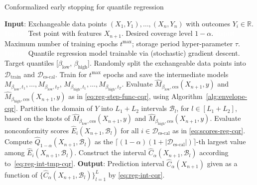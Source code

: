 \begin{algorithm}[H]
    \caption{Conformalized early stopping for quantile regression}
    \label{alg:reg-cqr}
    \begin{algorithmic}[1]
        \STATE \textbf{Input}: Exchangeable data points $(X_{1},Y_{1}), \ldots, (X_{n},Y_{n})$ with outcomes $Y_i \in \mathbb{R}$.
        \STATE \textcolor{white}{\textbf{Input}:} Test point with features $X_{n+1}$. Desired coverage level $1-\alpha$.
        \STATE \textcolor{white}{\textbf{Input}:} Maximum number of training epochs $t^{\text{max}}$; storage period hyper-parameter $\tau$.
        \STATE \textcolor{white}{\textbf{Input}:} Quantile regression model trainable via (stochastic) gradient descent. Target quantiles [$\beta_{\text{low}}$, $\beta_{\text{high}}$].
        \STATE Randomly split the exchangeable data points into $\mathcal{D}_{\text{train}}$ and $\mathcal{D}_{\text{es-cal}}$.
        \STATE Train for $t^{\text{max}}$ epochs and save the intermediate models $M_{\beta_{\text{low}}, t_1} , \dots, M_{\beta_{\text{low}}, t_T}$, $M_{\beta_{\text{high}}, t_1} , \dots, M_{\beta_{\text{high}}, t_T}$.
        \STATE Evaluate $\hat{M}_{\beta_{\text{low}},\text{ces}}(X_{n+1},y)$ and $\hat{M}_{\beta_{\text{high}},\text{ces}}(X_{n+1},y)$ as in \eqref{eq:reg-step-func-cqr}, using Algorithm~\ref{alg:envelope-cqr}.
        \STATE Partition the domain of $Y$ into $L_1+L_2$ intervals $\mathcal{B}_l$, for $l \in [L_1+L_2]$, based on the knots of $\hat{M}_{\beta_{\text{low}},\text{ces}}(X_{n+1},y)$ and $\hat{M}_{\beta_{\text{high}},\text{ces}}(X_{n+1},y)$.
        \STATE Evaluate nonconformity scores $\hat{E}_i(X_{n+1},\mathcal{B}_l)$ for all $i \in \mathcal{D}_{\text{es-cal}}$ as in \eqref{eq:scores-reg-cqr}.
        \STATE Compute $\hat{Q}_{1-\alpha}(X_{n+1},\mathcal{B}_l)$ as the $\lceil (1-\alpha)(1+|\mathcal{D}_{\text{es-cal}}|) \rceil$-th largest value among $\hat{E}_i(X_{n+1},\mathcal{B}_l)$.
 \STATE Construct the interval $\hat{C}_{\alpha}(X_{n+1}, \mathcal{B}_l)$ according to~\eqref{eq:reg-int-tmp-cqr}.
        \ENDFOR
        \STATE \textbf{Output}: Prediction interval $\hat{C}_{\alpha}(X_{n+1})$ given as a function of $\{\hat{C}_{\alpha}(X_{n+1}, \mathcal{B}_l)\}_{l=1}^{L}$ by \eqref{eq:reg-int-cqr}.
    \end{algorithmic}
\end{algorithm}


